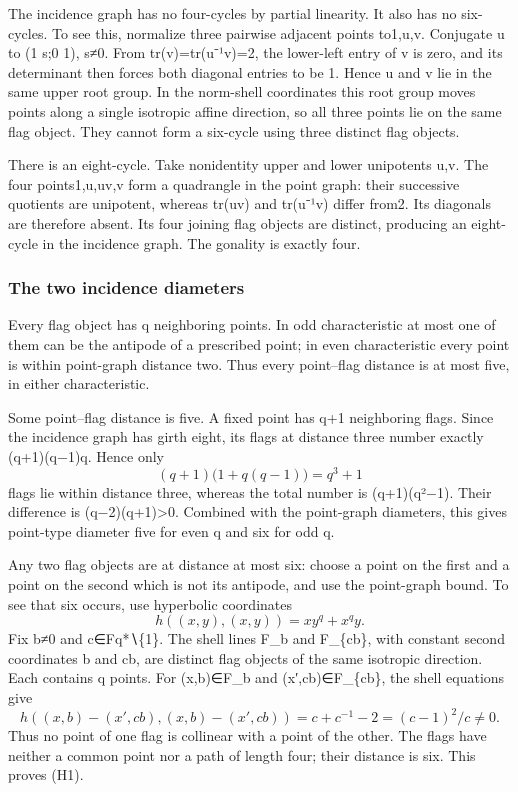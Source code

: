 The incidence graph has no four-cycles by partial linearity. It also has
no six-cycles. To see this, normalize three pairwise adjacent points
to1,u,v. Conjugate u to (1 s;0 1), s≠0. From tr(v)=tr(u⁻¹v)=2, the
lower-left entry of v is zero, and its determinant then forces both
diagonal entries to be 1. Hence u and v lie in the same upper root group.
In the norm-shell coordinates this root group moves points along a
single isotropic affine direction, so all three points lie on the same
flag object. They cannot form a six-cycle using three distinct flag
objects.

There is an eight-cycle. Take nonidentity upper and lower unipotents
u,v. The four points1,u,uv,v form a quadrangle in the point graph: their
successive quotients are unipotent, whereas tr(uv) and tr(u⁻¹v) differ
from2. Its diagonals are therefore absent. Its four joining flag objects
are distinct, producing an eight-cycle in the incidence graph. The
gonality is exactly four.

\subsubsection{The two incidence
diameters}\label{the-two-incidence-diameters}

Every flag object has q neighboring points. In odd characteristic at
most one of them can be the antipode of a prescribed point; in even
characteristic every point is within point-graph distance two. Thus
every point--flag distance is at most five, in either characteristic.

Some point--flag distance is five. A fixed point has q+1 neighboring
flags. Since the incidence graph has girth eight, its flags at distance
three number exactly (q+1)(q−1)q. Hence only \[
(q+1)\bigl(1+q(q-1)\bigr)=q^3+1
\] flags lie within distance three, whereas the total number is
(q+1)(q²−1). Their difference is (q−2)(q+1)\textgreater0. Combined with
the point-graph diameters, this gives point-type diameter five for even
q and six for odd q.

Any two flag objects are at distance at most six: choose a point on the
first and a point on the second which is not its antipode, and use the
point-graph bound. To see that six occurs, use hyperbolic coordinates \[
h((x,y),(x,y))=xy^q+x^qy.
\] Fix b≠0 and c∈Fq*∖\{1\}. The shell lines F\_b and F\_\{cb\}, with
constant second coordinates b and cb, are distinct flag objects of the
same isotropic direction. Each contains q points. For (x,b)∈F\_b and
(x′,cb)∈F\_\{cb\}, the shell equations give \[
h((x,b)-(x',cb),(x,b)-(x',cb))
 =c+c^{-1}-2=(c-1)^2/c\ne0.
\] Thus no point of one flag is collinear with a point of the other. The
flags have neither a common point nor a path of length four; their
distance is six. This proves (H1).

